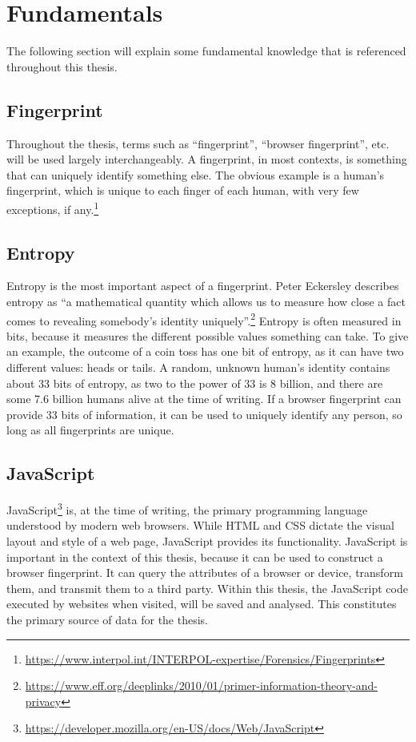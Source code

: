 \documentclass[
    fontsize=12pt,
    headings=small,
    parskip=half,
    bibliography=totoc,
    numbers=noenddot,
    open=any
    ]{scrreprt}
\begin{document}
\section{Fundamentals}
The following section will explain some fundamental knowledge that is
referenced throughout this thesis.

\subsection{Fingerprint}
\label{fundamentals:fingerprint}
Throughout the thesis, terms such as ``fingerprint'', ``browser fingerprint'', etc.
will be used largely interchangeably.
A fingerprint, in most contexts, is something that can uniquely identify something else.
The obvious example is a human's fingerprint, which is unique to each finger of each human,
with very few exceptions, if any.\footnote{\url{https://www.interpol.int/INTERPOL-expertise/Forensics/Fingerprints}}

\subsection{Entropy}
\label{fundamentals:entropy}
Entropy is the most important aspect of a fingerprint.
Peter Eckersley describes entropy as
``a mathematical quantity which allows us to measure how close a fact comes to revealing somebody's identity uniquely''.\footnote{\url{https://www.eff.org/deeplinks/2010/01/primer-information-theory-and-privacy}}
Entropy is often measured in bits, because it measures the different
possible values something can take.
To give an example, the outcome of a coin toss has one bit of entropy,
as it can have two different values: heads or tails.
A random, unknown human's identity contains about 33 bits of entropy,
as two to the power of 33 is 8 billion, and there are some 7.6 billion humans
alive at the time of writing.
If a browser fingerprint can provide 33 bits of information, it can be used
to uniquely identify any person, so long as all fingerprints are unique.

\subsection{JavaScript}
\label{fundamentals:javascript}
JavaScript\footnote{\url{https://developer.mozilla.org/en-US/docs/Web/JavaScript}} is,
at the time of writing, the primary programming language understood
by modern web browsers. While HTML and CSS dictate the visual layout and style
of a web page, JavaScript provides its functionality.
JavaScript is important in the context of this thesis, because
it can be used to construct a browser fingerprint. It can query
the attributes of a browser or device, transform them, and transmit them
to a third party.
Within this thesis, the JavaScript code executed by websites
when visited, will be saved and analysed.
This constitutes the primary source of data for the thesis.
\end{document}
